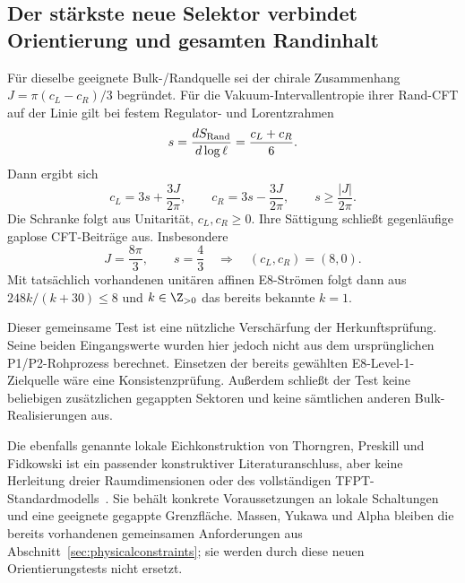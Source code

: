 \subsection{Der stärkste neue Selektor verbindet Orientierung und gesamten Randinhalt}\label{sec:chiralselector}
Für dieselbe geeignete Bulk-/Randquelle sei der chirale Zusammenhang $J=\pi(c_L-c_R)/3$ begründet. Für die Vakuum-Intervallentropie ihrer Rand-CFT auf der Linie gilt bei festem Regulator- und Lorentzrahmen~\cite{castroentropy}
\begin{equation}
s=\frac{dS_{\rm Rand}}{d\log\ell}=\frac{c_L+c_R}{6}.
\end{equation}
Dann ergibt sich
\begin{equation}
c_L=3s+\frac{3J}{2\pi},\qquad
c_R=3s-\frac{3J}{2\pi},\qquad
\boxed{s\ge\frac{|J|}{2\pi}.}
\end{equation}
Die Schranke folgt aus Unitarität, $c_L,c_R\ge0$. Ihre Sättigung schließt gegenläufige gaplose CFT-Beiträge aus. Insbesondere
\begin{equation}
J=\frac{8\pi}{3},\qquad s=\frac43
\quad\Longrightarrow\quad (c_L,c_R)=(8,0).
\end{equation}
Mit tatsächlich vorhandenen unitären affinen E8-Strömen folgt dann aus $248k/(k+30)\le8$ und $k\in\Z_{>0}$ das bereits bekannte $k=1$.

Dieser gemeinsame Test ist eine nützliche Verschärfung der Herkunftsprüfung. Seine beiden Eingangswerte wurden hier jedoch nicht aus dem ursprünglichen P1/P2-Rohprozess berechnet. Einsetzen der bereits gewählten E8-Level-1-Zielquelle wäre eine Konsistenzprüfung. Außerdem schließt der Test keine beliebigen zusätzlichen gegappten Sektoren und keine sämtlichen anderen Bulk-Realisierungen aus.

Die ebenfalls genannte lokale Eichkonstruktion von Thorngren, Preskill und Fidkowski ist ein passender konstruktiver Literaturanschluss, aber keine Herleitung dreier Raumdimensionen oder des vollständigen TFPT-Standardmodells~\cite{thorngrendisentanglers}. Sie behält konkrete Voraussetzungen an lokale Schaltungen und eine geeignete gegappte Grenzfläche. Massen, Yukawa und Alpha bleiben die bereits vorhandenen gemeinsamen Anforderungen aus Abschnitt~\ref{sec:physicalconstraints}; sie werden durch diese neuen Orientierungstests nicht ersetzt.


